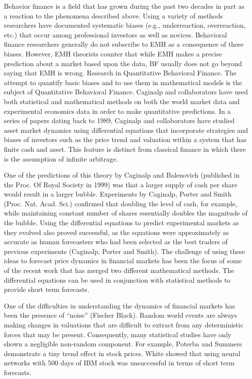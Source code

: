 Behavior finance is a field that has grown during the past two decades in part as a reaction to the phenomena described above. Using a variety of methods researchers have documented systematic biases (e.g., underreaction, overreaction, etc.) that occur among professional investors as well as novices. Behavioral finance researchers generally do not subscribe to EMH as a consequence of these biases. However, EMH theorists counter that while EMH makes a precise prediction about a market based upon the data, BF usually does not go beyond saying that EMH is wrong.
Research in Quantitative Behavioral Finance. The attempt to quantify basic biases and to use them in mathematical models is the subject of Quantitative Behavioral Finance. Caginalp and collaborators have used both statistical and mathematical methods on both the world market data and experimental economics data in order to make quantitative predictions. In a series of papers dating back to 1989, Caginalp and collaborators have studied asset market dynamics using differential equations that incorporate strategies and biases of investors such as the price trend and valuation within a system that has finite cash and asset. This feature is distinct from classical finance in which there is the assumption of infinite arbitrage.
 
One of the predictions of this theory by Caginalp and Balenovich (published in the Proc. Of Royal Society in 1999) was that a larger supply of cash per share would result in a larger bubble. Experiments by Caginalp, Porter and Smith (Proc. Nat. Acad. Sci.) confirmed that doubling the level of cash, for example, while maintaining constant number of shares essentially doubles the magnitude of the bubble.
Using the differential equations to predict experimental markets as they evolved also proved successful, as the equations were approximately as accurate as human forecasters who had been selected as the best traders of previous experiments (Caginalp, Porter and Smith).
The challenge of using these ideas to forecast price dynamics in financial markets has been the focus of some of the recent work that has merged two different mathematical methods. The differential equations can be used in conjunction with statistical methods to provide short term forecasts.
 
One of the difficulties in understanding the dynamics of financial markets has been the presence of “noise” (Fischer Black). Random world events are always making changes in valuations that are difficult to extract from any deterministic forces that may be present. Consequently, many statistical studies have only shown a negligible non-random component. For example, Poterba and Summers demonstrate a tiny trend effect in stock prices. White showed that using neural networks with 500 days of IBM stock was unsuccessful in terms of short term forecasts.
 
